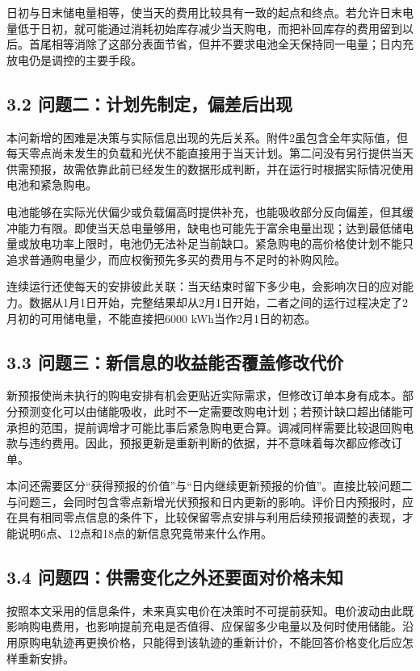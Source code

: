 \documentclass[11pt,a4paper]{article}
\begin{document}
日初与日末储电量相等，使当天的费用比较具有一致的起点和终点。若允许日末电量低于日初，就可能通过消耗初始库存减少当天购电，而把补回库存的费用留到以后。首尾相等消除了这部分表面节省，但并不要求电池全天保持同一电量；日内充放电仍是调控的主要手段。

\subsection*{3.2 问题二：计划先制定，偏差后出现}
本问新增的困难是决策与实际信息出现的先后关系。附件2虽包含全年实际值，但每天零点尚未发生的负载和光伏不能直接用于当天计划。第二问没有另行提供当天供需预报，故需依靠此前已经发生的数据形成判断，并在运行时根据实际情况使用电池和紧急购电。

电池能够在实际光伏偏少或负载偏高时提供补充，也能吸收部分反向偏差，但其缓冲能力有限。即使当天总电量够用，缺电也可能先于富余电量出现；达到最低储电量或放电功率上限时，电池仍无法补足当前缺口。紧急购电的高价格使计划不能只追求普通购电量少，而应权衡预先多买的费用与不足时的补购风险。

连续运行还使每天的安排彼此关联：当天结束时留下多少电，会影响次日的应对能力。数据从1月1日开始，完整结果却从2月1日开始，二者之间的运行过程决定了2月初的可用储电量，不能直接把6000 kWh当作2月1日的初态。

\newpage
\subsection*{3.3 问题三：新信息的收益能否覆盖修改代价}
新预报使尚未执行的购电安排有机会更贴近实际需求，但修改订单本身有成本。部分预测变化可以由储能吸收，此时不一定需要改购电计划；若预计缺口超出储能可承担的范围，提前调增才可能比事后紧急购电更合算。调减同样需要比较退回购电款与违约费用。因此，预报更新是重新判断的依据，并不意味着每次都应修改订单。

本问还需要区分“获得预报的价值”与“日内继续更新预报的价值”。直接比较问题二与问题三，会同时包含零点新增光伏预报和日内更新的影响。评价日内预报时，应在具有相同零点信息的条件下，比较保留零点安排与利用后续预报调整的表现，才能说明6点、12点和18点的新信息究竟带来什么作用。

\subsection*{3.4 问题四：供需变化之外还要面对价格未知}
按照本文采用的信息条件，未来真实电价在决策时不可提前获知。电价波动由此既影响购电费用，也影响提前充电是否值得、应保留多少电量以及何时使用储能。沿用原购电轨迹再更换价格，只能得到该轨迹的重新计价，不能回答价格变化后应怎样重新安排。
\end{document}
